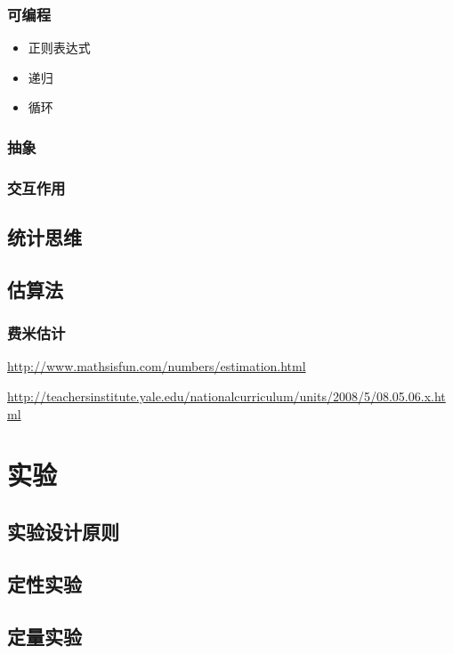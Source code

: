 \documentclass[]{book}
\begin{document}
\subsection{可编程}

\begin{itemize}
\item
  正则表达式
\item
  递归
\item
  循环
\end{itemize}

\subsection{抽象}

\subsection{交互作用}

\section{统计思维}

\section{估算法}

\subsection{费米估计}

\url{http://www.mathsisfun.com/numbers/estimation.html}

\url{http://teachersinstitute.yale.edu/nationalcurriculum/units/2008/5/08.05.06.x.html}

\chapter{实验}

\section{实验设计原则}

\section{定性实验}

\section{定量实验}
\end{document}
